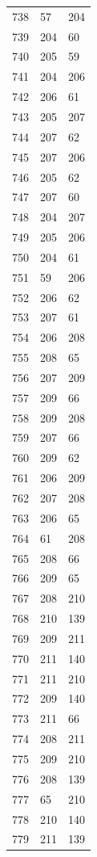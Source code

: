 \documentclass[a4paper,11pt]{article}
\begin{document}
\begin{center}
\begin{longtable}{|R{1.5cm}|R{1.5cm}|R{1.5cm}|}
  738 &   57 &  204 \\
  739 &  204 &   60 \\
  740 &  205 &   59 \\
  741 &  204 &  206 \\
  742 &  206 &   61 \\
  743 &  205 &  207 \\
  744 &  207 &   62 \\
  745 &  207 &  206 \\
  746 &  205 &   62 \\
  747 &  207 &   60 \\
  748 &  204 &  207 \\
  749 &  205 &  206 \\
  750 &  204 &   61 \\
  751 &   59 &  206 \\
  752 &  206 &   62 \\
  753 &  207 &   61 \\
  754 &  206 &  208 \\
  755 &  208 &   65 \\
  756 &  207 &  209 \\
  757 &  209 &   66 \\
  758 &  209 &  208 \\
  759 &  207 &   66 \\
  760 &  209 &   62 \\
  761 &  206 &  209 \\
  762 &  207 &  208 \\
  763 &  206 &   65 \\
  764 &   61 &  208 \\
  765 &  208 &   66 \\
  766 &  209 &   65 \\
  767 &  208 &  210 \\
  768 &  210 &  139 \\
  769 &  209 &  211 \\
  770 &  211 &  140 \\
  771 &  211 &  210 \\
  772 &  209 &  140 \\
  773 &  211 &   66 \\
  774 &  208 &  211 \\
  775 &  209 &  210 \\
  776 &  208 &  139 \\
  777 &   65 &  210 \\
  778 &  210 &  140 \\
  779 &  211 &  139 \\

\end{longtable}
\end{center}
\end{document}
